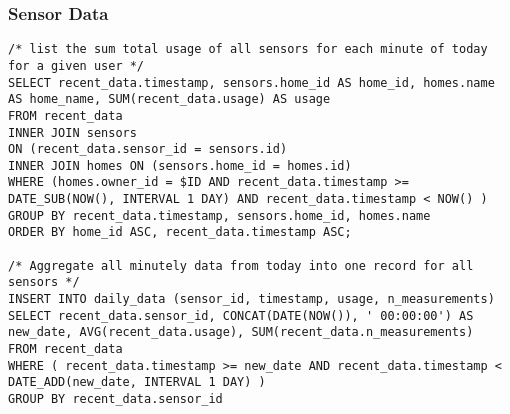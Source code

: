 \documentclass[11pt]{article}
\begin{document}
  \subsubsection{Sensor Data}
\begin{lstlisting}[style=SQL]
/* list the sum total usage of all sensors for each minute of today for a given user */
SELECT recent_data.timestamp, sensors.home_id AS home_id, homes.name AS home_name, SUM(recent_data.usage) AS usage
FROM recent_data
INNER JOIN sensors
ON (recent_data.sensor_id = sensors.id)
INNER JOIN homes ON (sensors.home_id = homes.id)
WHERE (homes.owner_id = $ID AND recent_data.timestamp >= DATE_SUB(NOW(), INTERVAL 1 DAY) AND recent_data.timestamp < NOW() )
GROUP BY recent_data.timestamp, sensors.home_id, homes.name
ORDER BY home_id ASC, recent_data.timestamp ASC;

/* Aggregate all minutely data from today into one record for all sensors */
INSERT INTO daily_data (sensor_id, timestamp, usage, n_measurements)
SELECT recent_data.sensor_id, CONCAT(DATE(NOW()), ' 00:00:00') AS new_date, AVG(recent_data.usage), SUM(recent_data.n_measurements)
FROM recent_data
WHERE ( recent_data.timestamp >= new_date AND recent_data.timestamp < DATE_ADD(new_date, INTERVAL 1 DAY) )
GROUP BY recent_data.sensor_id

\end{lstlisting}
\end{document}

